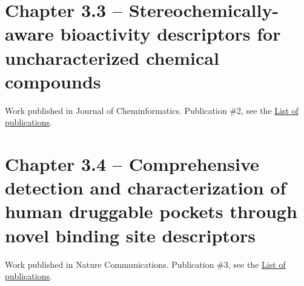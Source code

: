 \section[Stereochemically-aware bioactivity descriptors for uncharacterized chemical compounds]{Chapter 3.3 -- Stereochemically-aware bioactivity descriptors for uncharacterized chemical compounds}
\setcounter{figure}{0}
\renewcommand{\thefigure}{3.\arabic{section}.\arabic{figure}}
\hspace*{\fill} Work published in Journal of Cheminformatics. \newline
\hspace*{\fill} Publication \#2, see the \hyperref[ListOfPublications]{List of publications}.






\newpage




\section[Comprehensive detection and characterization of human druggable pockets through novel binding site descriptors]{Chapter 3.4 -- Comprehensive detection and characterization of human druggable pockets through novel binding site descriptors}
\setcounter{figure}{0}
\renewcommand{\thefigure}{3.\arabic{section}.\arabic{figure}}
\hspace*{\fill} Work published in Nature Communications.  \newline
\hspace*{\fill} Publication \#3, see the \hyperref[ListOfPublications]{List of publications}.








\newpage